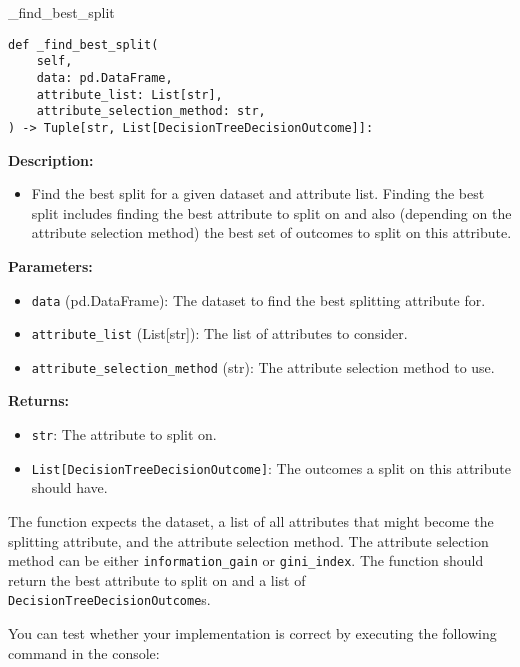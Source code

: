 \documentclass[
english,
smallborders
]{i6prcsht}
\begin{document}
\begin{functionbox}{\_find\_best\_split}
	\begin{lstlisting}[numbers=none]
def _find_best_split(
    self, 
    data: pd.DataFrame, 
    attribute_list: List[str], 
    attribute_selection_method: str,
) -> Tuple[str, List[DecisionTreeDecisionOutcome]]:
\end{lstlisting}
	
	\textbf{Description:}
	\begin{itemize}[leftmargin=*,topsep=0pt]
		\item Find the best split for a given dataset and attribute list. Finding the best split includes finding the best attribute to split on and also (depending on the attribute selection method) the best set of outcomes to split on this attribute.
	\end{itemize}
	
	\textbf{Parameters:}
	\begin{itemize}[leftmargin=*,topsep=0pt]
		\item \texttt{data} (pd.DataFrame): The dataset to find the best splitting attribute for.
		\item \texttt{attribute\_list} (List[str]): The list of attributes to consider.
		\item \texttt{attribute\_selection\_method} (str): The attribute selection method to use.
	\end{itemize}
	
	\textbf{Returns:}
	\begin{itemize}[leftmargin=*,topsep=0pt]
		\item \texttt{str}: The attribute to split on.
		\item \texttt{List[DecisionTreeDecisionOutcome]}: The outcomes a split on this attribute should have.
	\end{itemize}
\end{functionbox}

\vspace*{0.5cm}

The function expects the dataset, a list of all attributes that might become the splitting attribute, and the attribute selection method. The attribute selection method can be either \texttt{information\_gain} or \texttt{gini\_index}. The function should return the best attribute to split on and a list of \texttt{DecisionTreeDecisionOutcome}s.

You can test whether your implementation is correct by executing the following command in the console:
\end{document}
